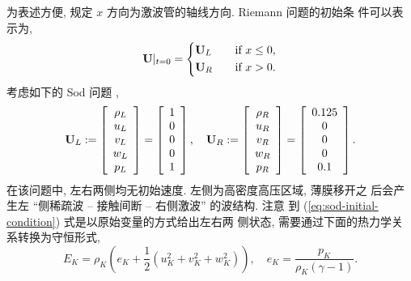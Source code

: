 为表述方便, 规定 $x$ 方向为激波管的轴线方向. Riemann 问题的初始条
件可以表示为,
\begin{equation}
  \label{eq:shock-tube-initial-condition}
  {\bf{U}}|_{t=0} = \left\{
    \begin{aligned}
      & {\bf{U}}_{L} & \quad & \mbox{if} ~ x\le 0,\\
      & {\bf{U}}_{R} & \quad & \mbox{if} ~ x > 0.
    \end{aligned}
  \right.
\end{equation}
考虑如下的 Sod 问题 \cite{Toro2009},
\begin{equation}
  \label{eq:sod-initial-condition}
  {\bf{U}}_{L} := \left[
    \begin{array}{c}
      \rho_{L}\\
      u_{L}\\
      v_{L}\\
      w_{L}\\
      p_{L}
    \end{array}
  \right] = \left[
    \begin{array}{c}
      1\\
      0\\
      0\\
      0\\
      1
    \end{array}
  \right], \quad
  {\bf{U}}_{R} := \left[
    \begin{array}{c}
      \rho_{R}\\
      u_{R}\\
      v_{R}\\
      w_{R}\\
      p_{R}
    \end{array}
  \right] = \left[
    \begin{array}{c}
      0.125\\
      0\\
      0\\
      0\\
      0.1
    \end{array}
  \right].
\end{equation}
在该问题中, 左右两侧均无初始速度. 左侧为高密度高压区域, 薄膜移开之
后会产生左 ``侧稀疏波 -- 接触间断 -- 右侧激波'' 的波结构. 注意
到 (\ref{eq:sod-initial-condition}) 式是以原始变量的方式给出左右两
侧状态, 需要通过下面的热力学关系转换为守恒形式,
\begin{equation}
  \label{eq:primitive-to-conservative}
  E_{K} = \rho_{K} \left( e_{K} + \frac{1}{2} (u_{K}^{2} +
    v_{K}^{2} + w_{K}^{2}) \right), \quad e_{K} =
  \frac{p_{K}}{\rho_{K}(\gamma - 1)}.
\end{equation}

